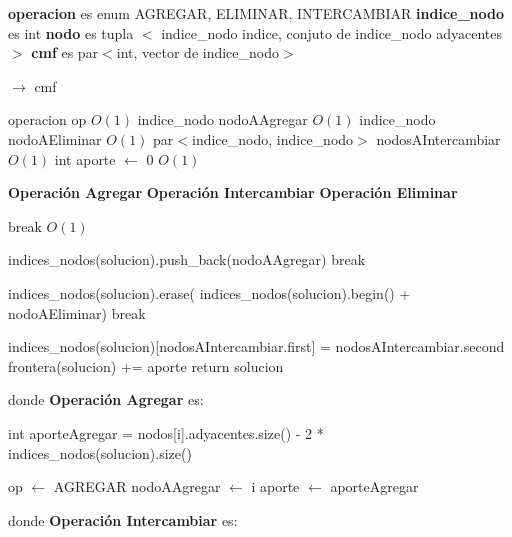 \documentclass[a4paper, 10pt, twoside]{article}
\newenvironment{pseudo}[1][]{%
    \vspace{1em}%
    \begin{algorithmic}%
}
{%
    \end{algorithmic}%
    \vspace{1em}%
}
\newcommand{\Ode}[1]{\hfill $O(#1)$}
\begin{document}
\begin{pseudo}

\State \textbf{operacion} es enum {AGREGAR, ELIMINAR, INTERCAMBIAR}
\State \textbf{indice\_nodo} es int
\State \textbf{nodo} es tupla $<$ indice\_nodo indice, conjuto de indice\_nodo adyacentes$>$
\State \textbf{cmf} es par$<$int, vector de indice\_nodo$>$

\State
{} $\rightarrow$ cmf
	
	\State operacion op 																		\Ode{1}
	\State indice\_nodo nodoAAgregar															\Ode{1}
	\State indice\_nodo nodoAEliminar															\Ode{1}
	\State par$<$indice\_nodo, indice\_nodo$>$ nodosAIntercambiar								\Ode{1}
	\State int aporte $\leftarrow$ 0															\Ode{1}

	\State
	\State \textbf{Operación Agregar}
	\State
	\State \textbf{Operación Intercambiar}
	\State
	\State \textbf{Operación Eliminar}
	\State

	 break \EndIf																\Ode{1}

		    \State indices\_nodos(solucion).push\_back(nodoAAgregar)
		    \State break
	    \EndCase

		    \State indices\_nodos(solucion).erase(
		    \State indices\_nodos(solucion).begin() + nodoAEliminar)
		    \State break
	    \EndCase

		    \State indices\_nodos(solucion)[nodosAIntercambiar.first] = nodosAIntercambiar.second
	    \EndCase
	\EndSwitch
	\State
	\State frontera(solucion) += aporte
	\State return solucion

\EndProcedure
\State
\State donde \textbf{Operación Agregar} es:
\State

				\State int aporteAgregar = nodos[i].adyacentes.size() - 2 * indices\_nodos(solucion).size()

					\State op $\leftarrow$ AGREGAR
					\State nodoAAgregar $\leftarrow$ i
					\State aporte $\leftarrow$ aporteAgregar
				\EndIf
			\EndIf
		\EndFor

\State
\State donde \textbf{Operación Intercambiar} es:
\State



\end{pseudo}
\end{document}
